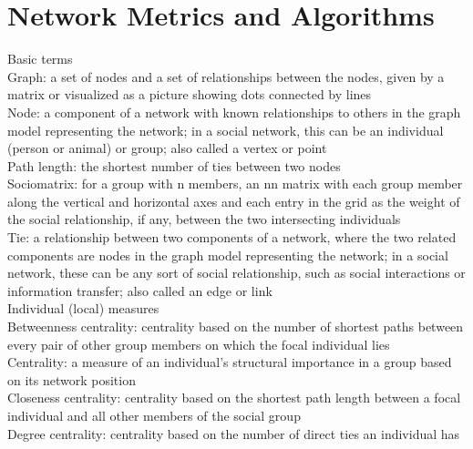 \section{Network Metrics and Algorithms}
Basic terms\\

Graph: a set of nodes and a set of relationships between the
nodes, given by a matrix or visualized as a picture showing
dots connected by lines\\

Node: a component of a network with known relationships
to others in the graph model representing the network; in
a social network, this can be an individual (person or animal)
or group; also called a vertex or point\\

Path length: the shortest number of ties between two nodes\\

Sociomatrix: for a group with n members, an nn matrix
with each group member along the vertical and horizontal
axes and each entry in the grid as the weight of the social relationship,
if any, between the two intersecting individuals\\

Tie: a relationship between two components of a network,
where the two related components are nodes in the graph
model representing the network; in a social network, these
can be any sort of social relationship, such as social interactions
or information transfer; also called an edge or link\\

Individual (local) measures\\

Betweenness centrality: centrality based on the number of
shortest paths between every pair of other group members
on which the focal individual lies\\

Centrality: a measure of an individual’s structural importance
in a group based on its network position\\

Closeness centrality: centrality based on the shortest path
length between a focal individual and all other members of
the social group\\

Degree centrality: centrality based on the number of direct
ties an individual has\\

